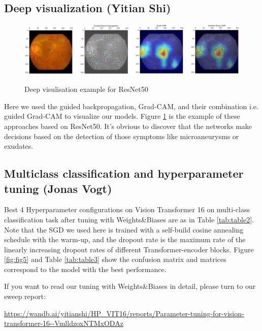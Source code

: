 \documentclass{article}
\begin{document}
\subsection{Deep visualization (Yitian Shi)}
\begin{figure}
\centering
{
\includegraphics[scale=0.28]{../pictures/deep_visualisation/deep_visulisation.png}
}
\caption{Deep visulisation example for ResNet50}
\label{fig:fig4}
\end{figure}
Here we used the guided backpropagation, Grad-CAM, and their combination i.e. guided Grad-CAM to visualize our models. Figure \ref{fig:fig4} is the example of these approaches based on ResNet50. It's obvious to discover that the networks make decisions based on the detection of those symptoms like microaneurysms or exudates.



\subsection{Multiclass classification and hyperparameter tuning (Jonas Vogt)}



Best 4 Hyperparameter configurations on Vision Transformer 16 on multi-class classification task after tuning with Weights\&Biases are as in Table \ref{tab:table2}. Note that the SGD we used here is trained with a self-build cosine annealing schedule with the warm-up, and the dropout rate is the maximum rate of the linearly increasing dropout rates of different Transformer-encoder blocks. Figure \ref{fig:fig5} and Table \ref{tab:table3} show the confusion matrix and matrices correspond to the model with the best performance.

If you want to read our tuning with Weights\&Biases in detail, please turn to our sweep report: 
\begin{center}
\url{https://wandb.ai/yitianshi/HP_VIT16/reports/Parameter-tuning-for-vision-transformer-16--VmlldzoxNTMxODAz}
\end{center}
\end{document}
